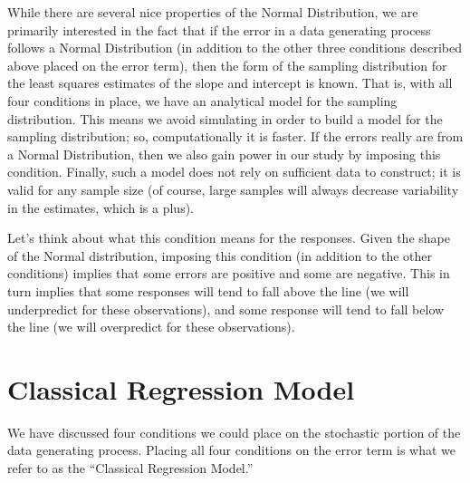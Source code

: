\documentclass[
]{book}
\theoremstyle{plain}
\theoremstyle{mydefn}
\theoremstyle{myexmpl}
\theoremstyle{remark}
\begin{document}
While there are several nice properties of the Normal Distribution, we are primarily interested in the fact that if the error in a data generating process follows a Normal Distribution (in addition to the other three conditions described above placed on the error term), then the form of the sampling distribution for the least squares estimates of the slope and intercept is known. That is, with all four conditions in place, we have an analytical model for the sampling distribution. This means we avoid simulating in order to build a model for the sampling distribution; so, computationally it is faster. If the errors really are from a Normal Distribution, then we also gain power in our study by imposing this condition. Finally, such a model does not rely on sufficient data to construct; it is valid for any sample size (of course, large samples will always decrease variability in the estimates, which is a plus).

Let's think about what this condition means for the responses. Given the shape of the Normal distribution, imposing this condition (in addition to the other conditions) implies that some errors are positive and some are negative. This in turn implies that some responses will tend to fall above the line (we will underpredict for these observations), and some response will tend to fall below the line (we will overpredict for these observations).

\hypertarget{classical-regression-model}{%
\section{Classical Regression Model}\label{classical-regression-model}}

We have discussed four conditions we could place on the stochastic portion of the data generating process. Placing all four conditions on the error term is what we refer to as the ``Classical Regression Model.''
\end{document}
